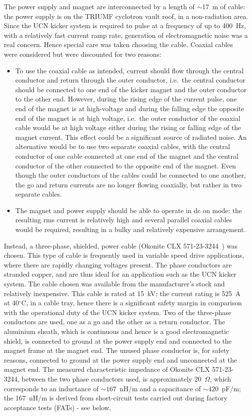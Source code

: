 \documentclass[aps,prab,twocolumn,superscriptaddress]{revtex4-1}
\begin{document}
The power supply and magnet are interconnected by a length of $\sim$17~m of cable: the power supply is on the TRIUMF cyclotron vault roof, in a non-radiation area. Since the UCN kicker system is required to pulse at a frequency of up to 400~Hz, with a relatively fast current ramp rate,  generation of electromagnetic noise was a real concern. Hence special care was taken choosing the cable. Coaxial cables were considered but were discounted for two reasons:
\begin{itemize}[leftmargin=*]
	\item To use the coaxial cable as intended, current should flow through the central conductor and return through the outer conductor, i.e.~the central conductor should be connected to one end of the kicker magnet and the outer conductor to the other end. However, during the rising edge of the current pulse, one end of the magnet is at high-voltage and during the falling edge the opposite end of the magnet is at high voltage, i.e.~the outer conductor of the coaxial cable would be at high voltage either during the rising or falling edge of the magnet current. This effect could be a significant source of radiated noise. An alternative would be to use two separate coaxial cables, with the central conductor of one cable connected at one end of the magnet and the central conductor of the other connected to the opposite end of the magnet. Even though the outer conductors of the cables could be connected to one another, the go and return currents are no longer flowing coaxially, but rather in two separate cables.
	\item The magnet and power supply should be able to operate in dc on mode: the resulting rms current is relatively high and several parallel coaxial cables would be required, resulting in a bulky and relatively expensive arrangement.
\end{itemize}
Instead, a three-phase, shielded, power cable (Okonite CLX 571-23-3244~\cite{Okonite}) was chosen. This type of cable is frequently used in variable speed drive applications, where there are rapidly changing voltages present. The phase conductors are stranded copper, and are thus ideal for an application such as the UCN kicker system. The cable chosen was available from the manufacturer's stock and relatively inexpensive. This cable is rated at 15~kV; the current rating is 525~A at 40$^\circ$C, in a cable tray, hence there is a significant safety margin in comparison with the operational duty of the UCN kicker system. Two of the three-phase conductors are used, one as a go and the other as a return conductor. The aluminium sheath, which is continuous and hence is a good electromagnetic shield, is connected to ground at the power supply end and connected to the magnet frame at the magnet end. The unused phase conductor is, for safety reasons, connected to ground at the power supply end and unconnected at the magnet end.   The measured characteristic impedance of Okonite CLX 571-23-3244, between the two phase conductors used, is approximately 20~$\Omega$, which corresponds to an inductance of $\sim 167$~nH/m and a capacitance of $\sim 420$~pF/m; the 167~nH/m is derived from short-circuit tests carried out during factory acceptance tests (FATs) - see below. 
\end{document}
